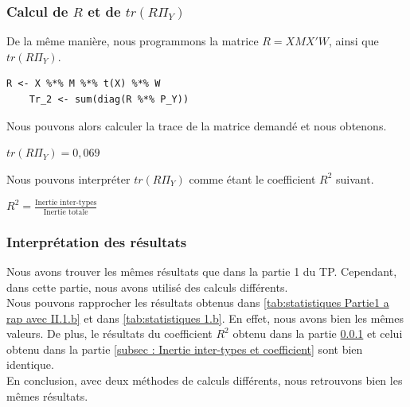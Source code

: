\documentclass{article}
\begin{document}
\subsubsection{Calcul de $R$ et de $tr(R\Pi_Y)$ }
\label{subsec:Question 1.c}
De la même manière, nous programmons la matrice $R=XMX'W$, ainsi que $tr(R\Pi_Y)$.
\begin{lstlisting}[caption=Extrait du code R, label= Question 1c]
    R <- X %*% M %*% t(X) %*% W
    Tr_2 <- sum(diag(R %*% P_Y))
\end{lstlisting}
Nous pouvons alors calculer la trace de la matrice demandé et nous obtenons.
\begin{center}
    $tr(R\Pi_Y)=0,069$
\end{center}
Nous pouvons interpréter $tr(R\Pi_Y)$ comme étant le coefficient $R^2$ suivant.
\begin{center}
    $R^2 = \frac{\text{Inertie inter-types}}{\text{Inertie totale}}$
\end{center}
\subsubsection{Interprétation des résultats }
Nous avons trouver les mêmes résultats que dans la partie 1 du TP. Cependant, dans cette partie, nous avons utilisé des calculs différents.\\
Nous pouvons rapprocher les résultats obtenus dans \autoref{tab:statistiques Partie1 a rap avec II.1.b} et dans \autoref{tab:statistiques 1.b}. En effet, nous avons bien
les mêmes valeurs. De plus, le résultats du coefficient $R^2$ obtenu dans la partie \ref{subsec:Question 1.c} et celui obtenu dans la partie \ref{subsec : Inertie inter-types et coefficient} sont bien identique.
\\En conclusion, avec deux méthodes de calculs différents, nous retrouvons bien les mêmes résultats.
\end{document}
